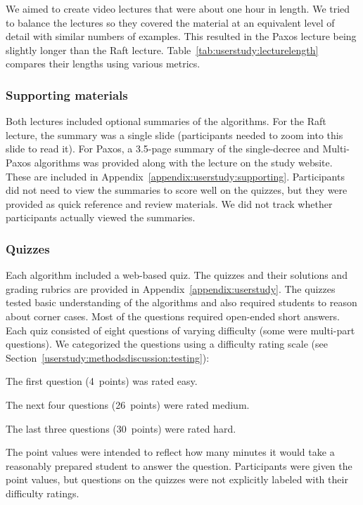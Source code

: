 We aimed to create video lectures that were about one hour in length. We
tried to balance the lectures so they covered the material at an
equivalent level of detail with similar numbers of examples. This
resulted in the Paxos lecture being slightly longer than the Raft
lecture. Table~\ref{tab:userstudy:lecturelength} compares their lengths using
various metrics.

\subsubsection{Supporting materials}

Both lectures included optional summaries of the algorithms.
For the Raft lecture, the summary was a single slide
(participants needed to zoom into this slide to read it).
For Paxos, a 3.5-page summary of the single-decree and Multi-Paxos algorithms
was provided along with the lecture on the study website.
These are included in Appendix~\ref{appendix:userstudy:supporting}.
Participants did not need to
view the summaries to score well on the quizzes, but they were provided
as quick reference and review materials.
We did not track whether participants actually viewed the summaries.

\subsubsection{Quizzes}
\label{userstudy:methods:materials:quizzes}

Each algorithm included a web-based quiz.
The quizzes and their solutions and grading rubrics are provided in
Appendix~\ref{appendix:userstudy}.
The quizzes tested basic understanding of the algorithms and also
required students to reason about corner cases.
Most of the questions required open-ended short answers.
Each quiz consisted of eight questions of varying difficulty (some were
multi-part questions). We categorized the questions using a difficulty
rating scale (see Section~\ref{userstudy:methodsdiscussion:testing}):
\begin{compactitem}
\item The first question (\SI{4}{points}) was rated easy.
\item The next four questions (\SI{26}{points}) were rated medium.
\item The last three questions (\SI{30}{points}) were rated hard.
\end{compactitem}
The point values were intended to reflect how many minutes it would take
a reasonably prepared student to answer the question.
Participants were given the point values, but questions on the quizzes were
not explicitly labeled with their difficulty ratings.


